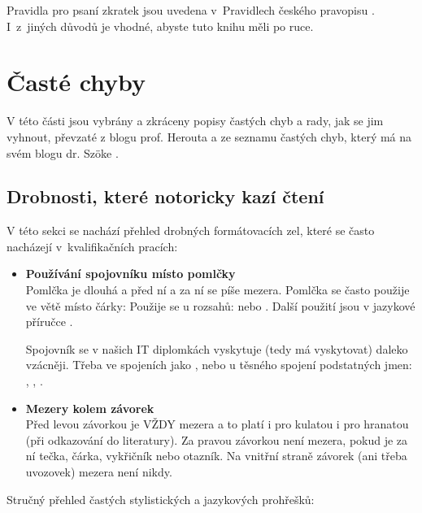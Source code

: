 Pravidla pro psaní zkratek jsou uvedena v~Pravidlech českého pravopisu \cite{Pravidla}. I~z~jiných důvodů je vhodné, abyste tuto knihu měli po ruce.


\section{Časté chyby}
\label{chyby}

V této části jsou vybrány a zkráceny popisy častých chyb a rady, jak se jim vyhnout, převzaté z blogu prof. Herouta \cite{Herout} a ze seznamu častých chyb, který má na svém blogu dr. Szöke \cite{chyby}.

\subsection*{Drobnosti, které notoricky kazí čtení}
V této sekci se nachází přehled drobných formátovacích zel, které se často nacházejí v~kvalifikačních pracích:

\begin{itemize}
	\item{
    	\textbf{Používání spojovníku místo pomlčky} \\
    	Pomlčka je dlouhá a před ní a za ní se píše mezera. Pomlčka se často použije ve větě místo čárky:  Použije se u rozsahů:  nebo . Další použití jsou v jazykové příručce \cite{prirucka}.

Spojovník se v našich IT diplomkách vyskytuje (tedy má vyskytovat) daleko vzácněji. Třeba ve spojeních jako , nebo u těsného spojení podstatných jmen: , , .
    }
    \item{
    	\textbf{Mezery kolem závorek} \\
        Před levou závorkou je VŽDY mezera a to platí i pro kulatou i pro hranatou (při odkazování do literatury). Za pravou závorkou není mezera, pokud je za ní tečka, čárka, vykřičník nebo otazník. Na vnitřní straně závorek (ani třeba uvozovek) mezera není nikdy.
    }
\end{itemize}

\noindent Stručný přehled častých stylistických a jazykových prohřešků:

